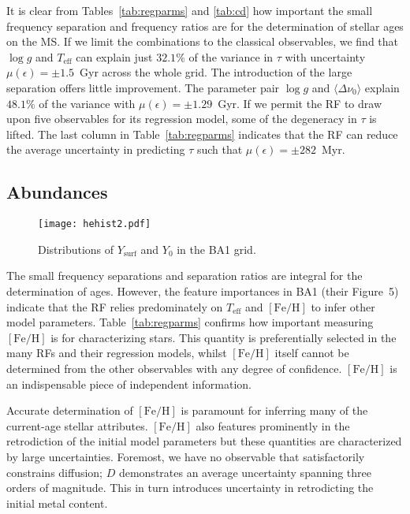 It is clear from Tables~\ref{tab:regparms} and \ref{tab:cd}  how important the small frequency separation and frequency ratios are for the determination of stellar ages on the MS. 
If we limit the combinations to the classical observables, we find that  ${\log{} g}$ and $T_{\text{eff}}$ can explain just $32.1\%$ of the variance in $\tau$ with uncertainty ${\mu (\epsilon) = \pm 1.5}$~Gyr across the whole grid. The introduction of the large separation offers little improvement. The parameter pair ${\log{} g}$ and ${\langle\Delta\nu_0\rangle}$  explain $48.1\%$ of the variance with  ${\mu (\epsilon) = \pm 1.29}$~Gyr.
If we permit the RF to draw upon five observables for its regression model, some of the degeneracy in $\tau$ is lifted.  The last column in Table~\ref{tab:regparms}
indicates that the RF can reduce the average uncertainty in predicting  $\tau$ such that  ${\mu (\epsilon) =\pm 282}$~Myr.

\subsection{Abundances}
\begin{figure}
    \centering
    \texttt{[image: hehist2.pdf]}
    \caption[Distributions of initial and surface helium abundances in the generated stellar models]{Distributions of $Y_{\text{surf}}$ and $Y_0$ in the BA1 grid.}
    \label{fig:Hehist}
\end{figure}
The small frequency separations and separation ratios are integral for the determination of ages. 
However, the feature importances in BA1 (their Figure~5) indicate that the RF relies predominately on  $T_{\text{eff}}$ and $[\text{Fe/H}]$ to infer other model parameters. 
Table~\ref{tab:regparms} confirms how important measuring $[\text{Fe/H}]$ is for characterizing stars. This quantity is preferentially selected in the many RFs and their regression models, whilst $[\text{Fe/H}]$ itself cannot be determined from the other observables with any degree of confidence.   
$[\text{Fe/H}]$ is an indispensable piece of independent information.

Accurate determination of $[\text{Fe/H}]$ is paramount for inferring many of the current-age stellar attributes. $[\text{Fe/H}]$ also features prominently in the retrodiction of the initial model parameters but these quantities are characterized by large uncertainties. Foremost, we have no observable that satisfactorily constrains diffusion; $D$ demonstrates an average uncertainty spanning three orders of magnitude. This in turn introduces uncertainty in retrodicting the initial metal content. 

